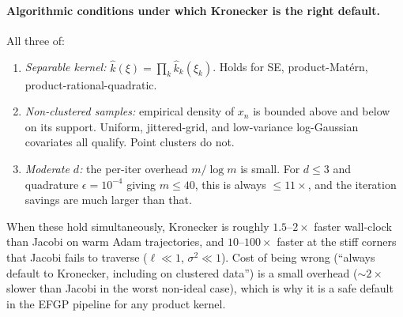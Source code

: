 \documentclass[11pt]{article}
\begin{document}
\paragraph{Algorithmic conditions under which Kronecker is the right
default.} All three of:
\begin{enumerate}\itemsep2pt
  \item \emph{Separable kernel:} $\hat k(\xi) = \prod_k \hat k_k(\xi_k)$.
        Holds for SE, product-Mat\'{e}rn, product-rational-quadratic.
  \item \emph{Non-clustered samples:} empirical density of $x_n$ is
        bounded above and below on its support. Uniform, jittered-grid,
        and low-variance log-Gaussian covariates all qualify. Point
        clusters do not.
  \item \emph{Moderate $d$:} the per-iter overhead $m/\log m$ is small.
        For $d \leq 3$ and quadrature $\epsilon = 10^{-4}$ giving
        $m \leq 40$, this is always $\leq 11\times$, and the iteration
        savings are much larger than that.
\end{enumerate}

When these hold simultaneously, Kronecker is roughly $1.5$--$2\times$
faster wall-clock than Jacobi on warm Adam trajectories, and
$10$--$100\times$ faster at the stiff corners that Jacobi fails to
traverse ($\ell \ll 1$, $\sigma^2 \ll 1$). Cost of being wrong
(``always default to Kronecker, including on clustered data'') is a
small overhead ($\sim\!2\times$ slower than Jacobi in the worst non-ideal
case), which is why it is a safe default in the EFGP pipeline for any
product kernel.
\end{document}
